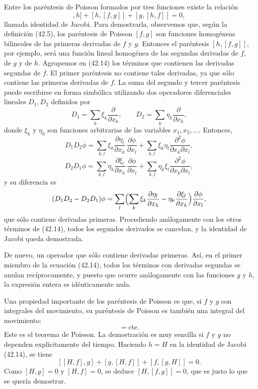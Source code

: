 \documentclass[12pt]{article}
\begin{document}
Entre los paréntesis de Poisson formados por tres funciones existe la relación
\begin{equation}
[[f,g],h]+[h,[f,g]]+[g,[h,f]]=0,
\tag{42.14}
\end{equation}
llamada identidad de Jacobi. Para demostrarla, observemos que, según la definición (42.5), los paréntesis de Poisson \([f,g]\) son funciones homogéneas bilineales de las primeras derivadas de \(f\) y \(g\). Entonces el paréntesis \([h,[f,g]]\), por ejemplo, será una función lineal homogénea de las segundas derivadas de \(f\), de \(g\) y de \(h\). Agrupemos en (42.14) los términos que contienen las derivadas segundas de \(f\). El primer paréntesis no contiene tales derivadas, ya que sólo contiene las primeras derivadas de \(f\). La suma del segundo y tercer paréntesis puede escribirse en forma simbólica utilizando dos operadores diferenciales lineales \(D_1,D_2\) definidos por
\[
D_1=\sum_k\xi_k\frac{\partial}{\partial x_k},
\qquad
D_2=\sum_k\eta_k\frac{\partial}{\partial x_k},
\]
donde \(\xi_k\) y \(\eta_k\) son funciones arbitrarias de las variables \(x_1,x_2,\dots\). Entonces,
\[
D_1D_2\phi
=\sum_{k,l}\xi_k\frac{\partial\eta_l}{\partial x_k}\,
\frac{\partial\phi}{\partial x_l}
+\sum_{k,l}\xi_k\eta_l\frac{\partial^2\phi}{\partial x_k\partial x_l},
\]
\[
D_2D_1\phi
=\sum_{k,l}\eta_k\frac{\partial\xi_l}{\partial x_k}\,
\frac{\partial\phi}{\partial x_l}
+\sum_{k,l}\eta_k\xi_l\frac{\partial^2\phi}{\partial x_k\partial x_l},
\]
y su diferencia es
\[
(D_1D_2-D_2D_1)\phi
=\sum_{l}\Bigl(\sum_k\xi_k\frac{\partial\eta_l}{\partial x_k}
            -\eta_k\frac{\partial\xi_l}{\partial x_k}\Bigr)
\frac{\partial\phi}{\partial x_l},
\]
que sólo contiene derivadas primeras. Procediendo análogamente con los otros términos de (42.14), todos los segundos derivados se cancelan, y la identidad de Jacobi queda demostrada.

De nuevo, un operador que sólo contiene derivadas primeras. Así, en el primer miembro de la ecuación (42.14), todos los términos con derivadas segundas se anulan recíprocamente, y puesto que ocurre análogamente con las funciones \(g\) y \(h\), la expresión entera es idénticamente nula.

Una propiedad importante de los paréntesis de Poisson es que, si \(f\) y \(g\) son integrales del movimiento, su paréntesis de Poisson es también una integral del movimiento:
\begin{equation}
[f,g]=\mathrm{cte}.
\tag{42.15}
\end{equation}
Este es el teorema de Poisson. La demostración es muy sencilla si \(f\) y \(g\) no dependen explícitamente del tiempo. Haciendo \(h=H\) en la identidad de Jacobi (42.14), se tiene
\[
[[H,f],g]+[g,[H,f]]+[f,[g,H]]=0.
\]
Como \( [H,g]=0\) y \([H,f]=0\), se deduce \([H,[f,g]]=0\), que es justo lo que se quería demostrar.
\end{document}
